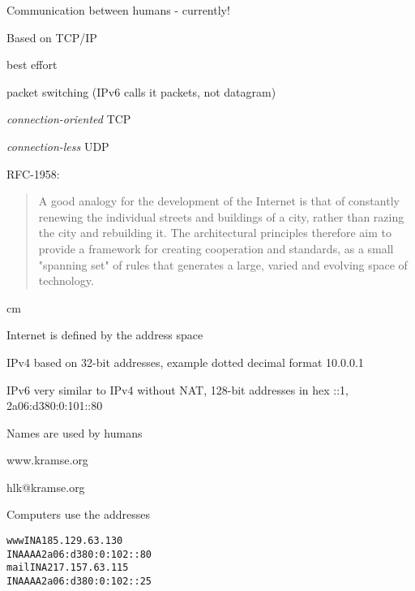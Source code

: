 \documentclass[Screen16to9,17pt]{foils}
\begin{document}

\begin{list1}
\item Communication between humans - currently!
\item Based on TCP/IP
\begin{list2}
\item best effort
\item packet switching (IPv6 calls it packets, not datagram)
\item \emph{connection-oriented} TCP
\item \emph{connection-less} UDP
\end{list2}
\end{list1}

RFC-1958:
\begin{quote}
 A good analogy for the development of the Internet is that of
 constantly renewing the individual streets and buildings of a city,
 rather than razing the city and rebuilding it. The architectural
 principles therefore aim to provide a framework for creating
 cooperation and standards, as a small "spanning set" of rules that
 generates a large, varied and evolving space of technology.
\end{quote}




 cm

\begin{list2}
\item Internet is defined by the address space
\item IPv4 based on 32-bit addresses, example dotted decimal format 10.0.0.1
\item IPv6 very similar to IPv4 without NAT, 128-bit addresses in hex ::1, 2a06:d380:0:101::80
\end{list2}



Names are used by humans
\begin{center}\hlkbig
www.kramse.org

hlk@kramse.org
\end{center}

Computers use the addresses

\begin{alltt}
www     IN      A       185.129.63.130
        IN      AAAA    2a06:d380:0:102::80
mail    IN      A       217.157.63.115
        IN      AAAA    2a06:d380:0:102::25
\end{alltt}
\end{document}
